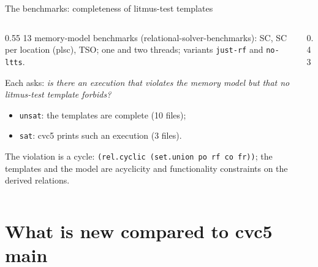 \documentclass[aspectratio=169]{beamer}
\newcommand{\sm}[1]{\texttt{#1}}
\begin{document}
\begin{frame}{The benchmarks: completeness of litmus-test templates}
  \begin{columns}[T]
  \begin{column}{0.55\textwidth}
    \small
    13 memory-model benchmarks (relational-solver-benchmarks): SC, SC per location (plsc),
    TSO; one and two threads; variants \sm{just-rf} and \sm{no-ltts}.
    \medskip

    Each asks: \emph{is there an execution that violates the memory model but that no
    litmus-test template forbids?}
    \begin{itemize}
      \item \sm{unsat}: the templates are complete (10 files);
      \item \sm{sat}: cvc5 prints such an execution (3 files).
    \end{itemize}
    The violation is a cycle: \sm{(rel.cyclic (set.union po rf co fr))}; the templates and the
    model are acyclicity and functionality constraints on the derived relations.
  \end{column}
  \begin{column}{0.43\textwidth}
    \centering
  \end{column}
  \end{columns}
\end{frame}

\section{What is new compared to cvc5 main}
\end{document}
